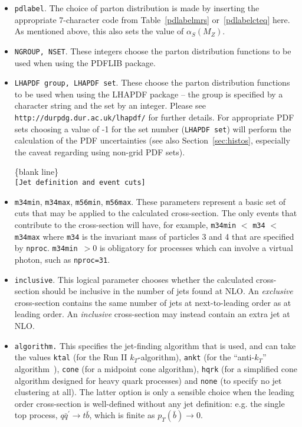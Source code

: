 \documentclass[12pt]{article}
\begin{document}
\begin{itemize}
\item {\tt pdlabel}. The choice of parton distribution is made by
inserting the appropriate 7-character code from Table~\ref{pdlabelmrs}
or~\ref{pdlabelcteq} here.
As mentioned above, this also sets the value of $\alpha_S(M_Z)$.

\item {\tt NGROUP, NSET}. These integers choose the parton distribution
functions to be used when using the PDFLIB package.
\item {\tt LHAPDF group, LHAPDF set}. These choose the parton
distribution functions to be used when using the LHAPDF package --
the group is specified by a character string and the set by an integer.
Please see {\tt http://durpdg.dur.ac.uk/lhapdf/} for further details.
For appropriate PDF sets choosing a value of -1 for the set number ({\tt  LHAPDF set}) 
will perform the calculation of the PDF uncertainties (see also
Section~\ref{sec:histos}, especially the caveat regarding using
non-grid PDF sets).

\begin{center}
\{blank line\} \\
{\tt [Jet definition and event cuts] }
\end{center}

\item {\tt m34min}, {\tt m34max}, {\tt m56min}, {\tt m56max}.
These parameters represent a basic set of cuts that may be applied
to the calculated cross-section. The only events that contribute to
the cross-section will have, for example,
{\tt m34min} $<$ {\tt m34} $<$ {\tt m34max} where {\tt m34} is the
invariant mass of particles 3 and 4 that are specified by {\tt nproc}.
{\tt m34min}~$> 0$ is obligatory for processes which can involve a virtual
photon, such as {\tt nproc=31}.
\item {\tt inclusive}.  This logical parameter chooses whether the
calculated cross-section should be inclusive in the number of jets
found at NLO. An {\em exclusive}
cross-section contains the same number of jets at next-to-leading
order as at leading order. An {\em inclusive} cross-section may
instead contain an extra jet at NLO.

\item {\tt algorithm.} This specifies the jet-finding algorithm that
is used, and can take the values
{\tt ktal} (for the Run II $k_T$-algorithm), {\tt ankt} (for the
``anti-$k_T$'' algorithm~\cite{Cacciari:2008}), {\tt cone} (for
a midpoint cone algorithm), {\tt hqrk} (for a simplified cone
algorithm designed for heavy quark processes) and {\tt none} (to
specify no jet clustering at all). The latter option is only a
sensible choice when the leading order cross-section is well-defined
without any jet definition: e.g. the single top process,
$q{\bar q^\prime} \to t{\bar b}$, which is finite as
$p_T({\bar b}) \to 0$.


\end{itemize}
\end{document}

